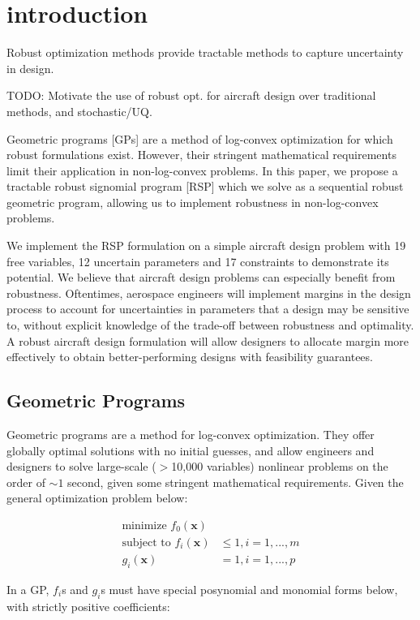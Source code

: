 \section{introduction}
Robust optimization methods provide tractable methods to capture uncertainty in design.

TODO: Motivate the use of robust opt. for aircraft design over traditional methods, and stochastic/UQ.

Geometric programs [GPs] are a method of log-convex optimization for which robust formulations exist. However, their stringent mathematical requirements limit their application in non-log-convex problems. In this paper, we propose a tractable robust signomial program [RSP] which we solve as a sequential robust geometric program, allowing us to implement robustness in non-log-convex problems.

We implement the RSP formulation on a simple aircraft design problem with 19 free variables, 12 uncertain parameters and 17 constraints to demonstrate its potential. We believe that aircraft design problems can especially benefit from robustness. Oftentimes, aerospace engineers will implement margins in the design process to account for uncertainties in parameters that a design may be sensitive to, without explicit knowledge of the trade-off between robustness and optimality. A robust aircraft design formulation will allow designers to allocate margin more effectively to obtain better-performing designs with feasibility guarantees.

\subsection{Geometric Programs}

Geometric programs are a method for log-convex optimization. They offer globally optimal solutions with no initial guesses, and allow engineers and designers to solve large-scale ($>$10,000 variables) nonlinear problems on the order of $\sim1$ second, given some stringent mathematical requirements. Given the general optimization problem below:

\begin{align}
\label{e:gpform}
\textrm{minimize } f_0(\mathbf{x}) & \nonumber \\
\textrm{subject to } f_i(\mathbf{x}) &\leq 1, i=1,...,m \\
g_i (\mathbf{x}) &= 1, i = 1,...,p \nonumber
\end{align}

In a GP, $f_{i}$s and $g_{i}$s must have special posynomial and monomial forms below, with strictly positive coefficients:

